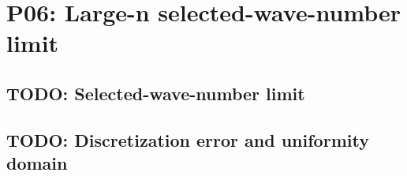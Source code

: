 
\section{P06: Large-n selected-wave-number limit}
\label{sec:P06}

\subsection{TODO: Selected-wave-number limit}
\label{slot:P06-1}

\subsection{TODO: Discretization error and uniformity domain}
\label{slot:P06-2}
